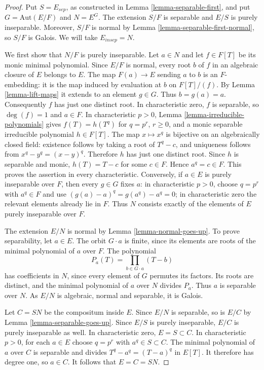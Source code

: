 \begin{proof}
Put $S = E_{sep}$, as constructed in Lemma \ref{lemma-separable-first},
and put $G = \text{Aut}(E/F)$ and $N = E^G$.
The extension $S/F$ is separable and $E/S$ is purely inseparable.
Moreover, $S/F$ is normal by Lemma \ref{lemma-separable-first-normal},
so $S/F$ is Galois. We will take $E_{insep} = N$.

\medskip\noindent
We first show that $N/F$ is purely inseparable. Let $a \in N$ and let
$f \in F[T]$ be its monic minimal polynomial. Since $E/F$ is normal,
every root $b$ of $f$ in an algebraic closure of $E$ belongs to $E$.
The map $F(a) \to E$ sending $a$ to $b$ is an $F$-embedding:
it is the map induced by evaluation at $b$ on $F[T]/(f)$.
By Lemma \ref{lemma-lift-maps} it extends to an element $g \in G$.
Thus $b = g(a) = a$. Consequently $f$ has just one distinct root.
In characteristic zero, $f$ is separable, so $\deg(f) = 1$ and $a \in F$.
In characteristic $p > 0$, Lemma \ref{lemma-irreducible-polynomials}
gives $f(T) = h(T^q)$ for $q = p^r$, $r \geq 0$, and a monic
separable irreducible polynomial $h \in F[T]$.
The map $x \mapsto x^q$ is bijective on an algebraically closed field:
existence follows by taking a root of $T^q-c$, and uniqueness follows
from $x^q-y^q=(x-y)^q$. Therefore $h$ has just one distinct root.
Since $h$ is separable and monic, $h(T)=T-c$ for some $c \in F$.
Hence $a^q=c \in F$. This proves the assertion in every characteristic.
Conversely, if $a \in E$ is purely inseparable over $F$, then every
$g \in G$ fixes $a$: in characteristic $p>0$, choose $q=p^r$ with
$a^q\in F$ and use $(g(a)-a)^q=g(a^q)-a^q=0$; in characteristic
zero the relevant elements already lie in $F$.
Thus $N$ consists exactly of the elements of $E$ purely inseparable
over $F$.

\medskip\noindent
The extension $E/N$ is normal by Lemma \ref{lemma-normal-goes-up}.
To prove separability, let $a \in E$. The orbit $G\cdot a$ is finite,
since its elements are roots of the minimal polynomial of $a$ over $F$.
The polynomial
$$
P_a(T)=\prod_{b\in G\cdot a}(T-b)
$$
has coefficients in $N$, since every element of $G$ permutes its factors.
Its roots are distinct, and the minimal polynomial of $a$ over $N$
divides $P_a$. Thus $a$ is separable over $N$. As $E/N$ is algebraic,
normal and separable, it is Galois.

\medskip\noindent
Let $C=SN$ be the compositum inside $E$. Since $E/N$ is separable,
so is $E/C$ by Lemma \ref{lemma-separable-goes-up}. Since $E/S$
is purely inseparable, $E/C$ is purely inseparable as well.
In characteristic zero, $E=S\subset C$. In characteristic $p>0$,
for each $a\in E$ choose $q=p^r$ with $a^q\in S\subset C$.
The minimal polynomial of $a$ over $C$ is separable and divides
$T^q-a^q=(T-a)^q$ in $E[T]$. It therefore has degree one, so $a\in C$.
It follows that $E=C=SN$.


\end{proof}
